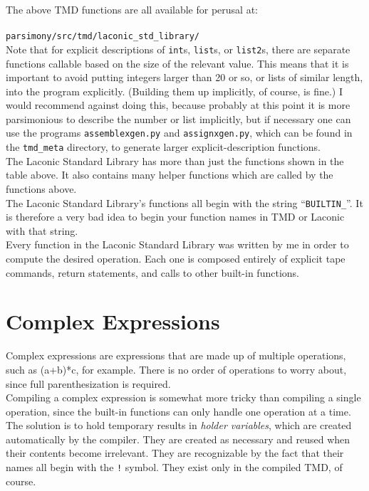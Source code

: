 \documentclass[11pt]{article}
\begin{document}
The above TMD functions are all available for perusal at: \\ \\
\texttt{parsimony/src/tmd/laconic_std_library/} \\

Note that for explicit descriptions of \texttt{int}s, \texttt{list}s, or \texttt{list2}s, there are separate functions callable based on the size of the relevant value. This means that it is important to avoid putting integers larger than 20 or so, or lists of similar length, into the program explicitly. (Building them up implicitly, of course, is fine.) I would recommend against doing this, because probably at this point it is more parsimonious to describe the number or list implicitly, but if necessary one can use the programs \texttt{assemblexgen.py} and \texttt{assignxgen.py}, which can be found in the \texttt{tmd_meta} directory, to generate larger explicit-description functions. \\

The Laconic Standard Library has more than just the functions shown in the table above. It also contains many helper functions which are called by the functions above. \\

The Laconic Standard Library's functions all begin with the string ``\texttt{BUILTIN_}''. It is therefore a very bad idea to begin your function names in TMD or Laconic with that string. \\

Every function in the Laconic Standard Library was written by me in order to compute the desired operation. Each one is composed entirely of explicit tape commands, return statements, and calls to other built-in functions.

\section{Complex Expressions}

Complex expressions are expressions that are made up of multiple operations, such as (a+b)*c, for example. There is no order of operations to worry about, since full parenthesization is required. \\

Compiling a complex expression is somewhat more tricky than compiling a single operation, since the built-in functions can only handle one operation at a time. The solution is to hold temporary results in \emph{holder variables}, which are created automatically by the compiler. They are created as necessary and reused when their contents become irrelevant. They are recognizable by the fact that their names all begin with the \texttt{!} symbol. They exist only in the compiled TMD, of course. \\
\end{document}
